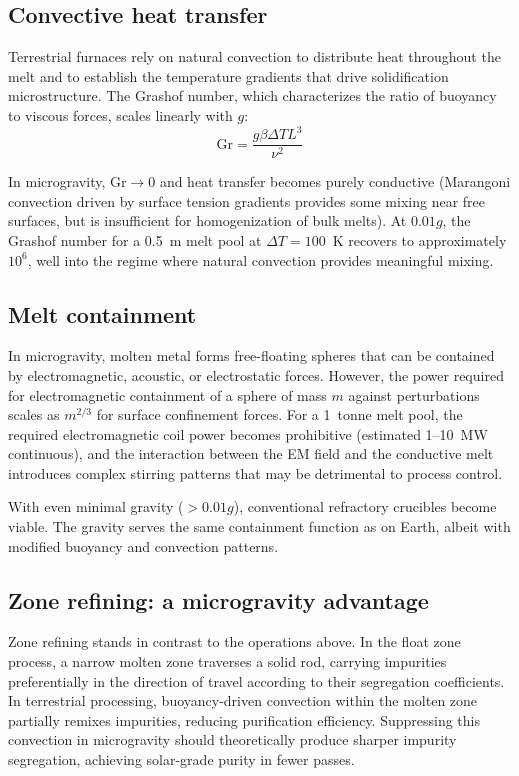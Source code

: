 \documentclass[preprint,12pt]{elsarticle}
\begin{document}
\subsection{Convective heat transfer}

Terrestrial furnaces rely on natural convection to distribute heat throughout the melt and to establish the temperature gradients that drive solidification microstructure. The Grashof number, which characterizes the ratio of buoyancy to viscous forces, scales linearly with $g$:
\begin{equation}
    \mathrm{Gr} = \frac{g \beta \Delta T L^3}{\nu^2}
    \label{eq:grashof}
\end{equation}

In microgravity, $\mathrm{Gr} \to 0$ and heat transfer becomes purely conductive (Marangoni convection driven by surface tension gradients provides some mixing near free surfaces, but is insufficient for homogenization of bulk melts). At $0.01g$, the Grashof number for a 0.5~m melt pool at $\Delta T = 100$~K recovers to approximately $10^6$, well into the regime where natural convection provides meaningful mixing.

\subsection{Melt containment}

In microgravity, molten metal forms free-floating spheres that can be contained by electromagnetic, acoustic, or electrostatic forces. However, the power required for electromagnetic containment of a sphere of mass $m$ against perturbations scales as $m^{2/3}$ for surface confinement forces. For a 1~tonne melt pool, the required electromagnetic coil power becomes prohibitive (estimated 1--10~MW continuous), and the interaction between the EM field and the conductive melt introduces complex stirring patterns that may be detrimental to process control.

With even minimal gravity ($> 0.01g$), conventional refractory crucibles become viable. The gravity serves the same containment function as on Earth, albeit with modified buoyancy and convection patterns.

\subsection{Zone refining: a microgravity advantage}

Zone refining stands in contrast to the operations above. In the float zone process, a narrow molten zone traverses a solid rod, carrying impurities preferentially in the direction of travel according to their segregation coefficients. In terrestrial processing, buoyancy-driven convection within the molten zone partially remixes impurities, reducing purification efficiency. Suppressing this convection in microgravity should theoretically produce sharper impurity segregation, achieving solar-grade purity in fewer passes.
\end{document}
